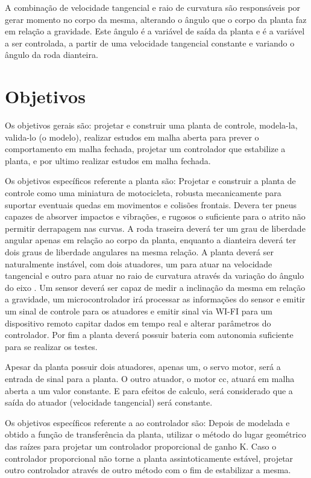\documentclass[conference,harvard,brazil,english]{sbatex}
\begin{document}
        A combinação de velocidade tangencial e raio de curvatura são responsáveis por gerar momento no corpo da mesma, alterando o ângulo que o corpo da planta faz em relação a gravidade. Este ângulo é a variável de saída da planta e é a variável a ser controlada, a partir de uma velocidade tangencial constante e variando o ângulo da roda dianteira.
    
    \section{Objetivos}
    
        Os objetivos gerais são: projetar e construir uma planta de controle, modela-la, valida-lo (o modelo), realizar estudos em malha aberta para prever o comportamento em malha fechada, projetar um controlador que estabilize a planta, e por ultimo realizar estudos em malha fechada.
        
        Os objetivos específicos referente a planta são: Projetar e construir a planta de controle como uma miniatura de motocicleta, robusta mecanicamente para suportar eventuais quedas em movimentos e colisões frontais. Devera ter pneus capazes de absorver impactos e vibrações, e rugosos o suficiente para o atrito não permitir derrapagem nas curvas. A roda traseira deverá ter um grau de liberdade angular apenas em relação ao corpo da planta, enquanto a dianteira deverá ter dois graus de liberdade angulares na mesma relação. A planta deverá ser naturalmente instável, com dois atuadores, um para atuar na velocidade tangencial e outro para atuar no raio de curvatura através da variação do ângulo do eixo . Um sensor deverá ser capaz de medir a inclinação da mesma em relação a gravidade, um microcontrolador irá processar as informações do sensor e emitir um sinal de controle para os atuadores e emitir sinal via WI-FI para um dispositivo remoto capitar dados em tempo real e alterar parâmetros do controlador. Por fim a planta deverá possuir bateria com autonomia suficiente para se realizar os testes.
        
        Apesar da planta possuir dois atuadores, apenas um, o servo motor, será a entrada de sinal para a planta. O outro atuador, o motor cc, atuará em malha aberta a um valor constante. E para efeitos de calculo, será considerado que a saída do atuador (velocidade tangencial) será constante.
        
        Os objetivos específicos referente a ao controlador são: Depois de modelada e obtido a função de transferência da planta, utilizar o método do lugar geométrico das raízes para projetar um controlador proporcional de ganho K. Caso o controlador proporcional não torne a planta assintoticamente estável, projetar outro controlador através de outro método com o fim de estabilizar a mesma.
        
\end{document}
